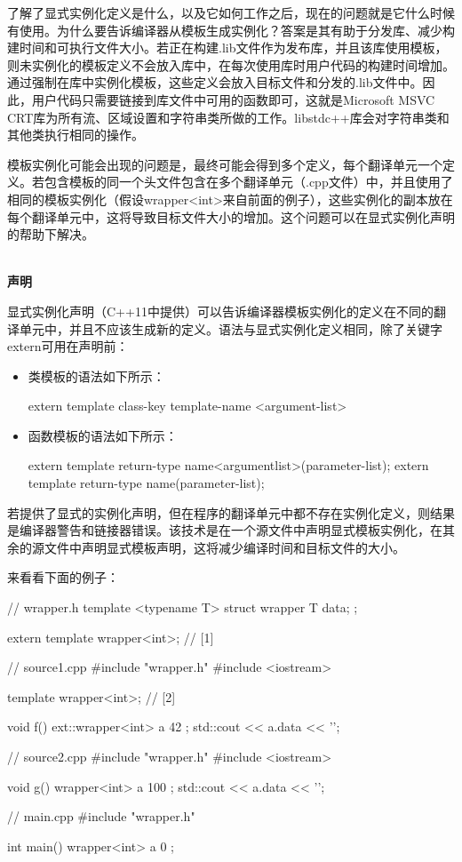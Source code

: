 了解了显式实例化定义是什么，以及它如何工作之后，现在的问题就是它什么时候有使用。为什么要告诉编译器从模板生成实例化？答案是其有助于分发库、减少构建时间和可执行文件大小。若正在构建.lib文件作为发布库，并且该库使用模板，则未实例化的模板定义不会放入库中，在每次使用库时用户代码的构建时间增加。通过强制在库中实例化模板，这些定义会放入目标文件和分发的.lib文件中。因此，用户代码只需要链接到库文件中可用的函数即可，这就是Microsoft MSVC CRT库为所有流、区域设置和字符串类所做的工作。libstdc++库会对字符串类和其他类执行相同的操作。

模板实例化可能会出现的问题是，最终可能会得到多个定义，每个翻译单元一个定义。若包含模板的同一个头文件包含在多个翻译单元（.cpp文件）中，并且使用了相同的模板实例化（假设wrapper<int>来自前面的例子），这些实例化的副本放在每个翻译单元中，这将导致目标文件大小的增加。这个问题可以在显式实例化声明的帮助下解决。

\hspace*{\fill} \\ %
\noindent\textbf{声明}

显式实例化声明（C++11中提供）可以告诉编译器模板实例化的定义在不同的翻译单元中，并且不应该生成新的定义。语法与显式实例化定义相同，除了关键字extern可用在声明前：

\begin{itemize}
\item 
类模板的语法如下所示：
\begin{cpp}
extern template class-key template-name <argument-list>
\end{cpp}

\item 
函数模板的语法如下所示：
\begin{cpp}
extern template return-type name<argumentlist>(parameter-list);
extern template return-type name(parameter-list);
\end{cpp}
\end{itemize}

若提供了显式的实例化声明，但在程序的翻译单元中都不存在实例化定义，则结果是编译器警告和链接器错误。该技术是在一个源文件中声明显式模板实例化，在其余的源文件中声明显式模板声明，这将减少编译时间和目标文件的大小。

来看看下面的例子：

\begin{cpp}
// wrapper.h
template <typename T>
struct wrapper
{
	T data;
};

extern template wrapper<int>; // [1]

// source1.cpp
#include "wrapper.h"
#include <iostream>

template wrapper<int>; // [2]

void f()
{
	ext::wrapper<int> a{ 42 };
	std::cout << a.data << '\n';
}

// source2.cpp
#include "wrapper.h"
#include <iostream>

void g()
{
	wrapper<int> a{ 100 };
	std::cout << a.data << '\n';
}

// main.cpp
#include "wrapper.h"

int main()
{
	wrapper<int> a{ 0 };
}
\end{cpp}

